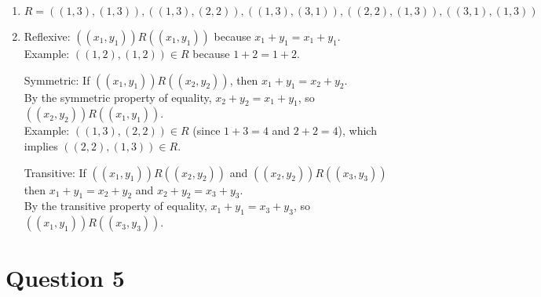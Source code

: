 \documentclass[twoside]{article}
\begin{document}
\begin{enumerate}
    \item[(a.)] \[ R = ((1,3), (1,3)), ((1,3), (2,2)), ((1,3), (3,1)), ((2,2), (1,3)), ((3,1), (1,3)) \]
    \item[(b.)] Reflexive: $((x_1, y_1)) R ((x_1, y_1))$ because $x_1+y_1 = x_1+y_1$. \\
                Example: $((1,2), (1,2)) \in R$ because $1+2 = 1+2$. 

                Symmetric: If $((x_1, y_1)) R ((x_2, y_2))$, then $x_1+y_1 = x_2+y_2$. \\
                By the symmetric property of equality, $x_2+y_2 = x_1+y_1$, so $((x_2, y_2)) R ((x_1, y_1))$. \\
                Example: $((1,3), (2,2)) \in R$ (since $1+3=4$ and $2+2=4$), which implies $((2,2), (1,3)) \in R$. 
                
                Transitive: If $((x_1, y_1)) R ((x_2, y_2))$ and $((x_2, y_2)) R ((x_3, y_3))$ \\ 
                then $x_1+y_1 = x_2+y_2$ and $x_2+y_2 = x_3+y_3$. \\ 
                By the transitive property of equality, $x_1+y_1 = x_3+y_3$, so $((x_1, y_1)) R ((x_3, y_3))$.
\end{enumerate}

\section*{Question 5}
\end{document}
